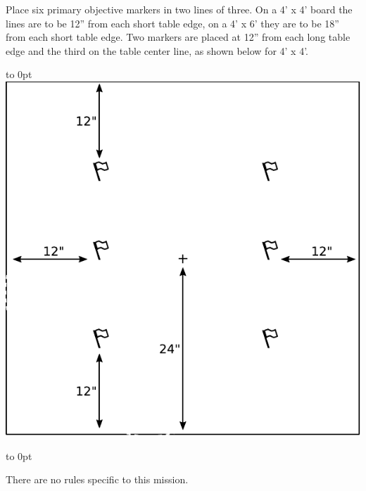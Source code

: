 

\begin{tablesetup}    
  \dawnofwar

  \smallskip%
  Place six primary objective markers in two lines of three.  On a 4'
  x 4' board the lines are to be 12'' from each short table edge, on a
  4' x 6' they are to be 18'' from each short table edge.  Two markers
  are placed at 12'' from each long table edge and the third on the
  table center line, as shown below for 4' x 4'.

  \hfill
  \begin{minipage}[t]{2.5in}\vbox to 0pt{}
  \includegraphics[width=\linewidth]{missions/ground-placement}
  \end{minipage}
  \hfill\hbox to 0pt{}

\end{tablesetup}

\begin{missionrules}

\bigskip
There are no rules specific to this mission.

\end{missionrules}


